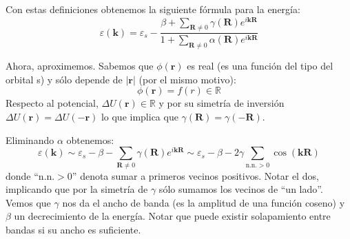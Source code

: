 Con estas definiciones obtenemos la siguiente fórmula para la energía:
\begin{equation}
  \boxed{
   \varepsilon(\mathbf{k}) = \varepsilon_s - \frac{\displaystyle \beta +
    \sum_{\mathbf{R}\neq 0}\gamma(\mathbf{R}) e^{i
      \mathbf{k}\mathbf{R}}}{\displaystyle 1 + \sum_{\mathbf{R}\neq 0}
    \alpha(\mathbf{R})e^{i \mathbf{k}\mathbf{R}}}
  } \tag{s band energy}
\end{equation}

Ahora, aproximemos. Sabemos que $\phi(\mathbf{r})$ es real (es una
función del tipo del orbital s) y sólo depende de $|\mathbf{r}|$ (por
el mismo motivo):
\begin{equation}
  \phi (\mathbf{r}) = f(r) \in \mathbb{R}
\end{equation}
Respecto al potencial, $\Delta U(\mathbf{r}) \in \mathbb{R}$ y por su
simetría de inversión $ \Delta U (\mathbf{r}) =
  \Delta U(- \mathbf{r})$ lo que implica que $\gamma(\mathbf{R}) =
  \gamma(-\mathbf{R})$.

Eliminando $\alpha$ obtenemos:
\begin{equation}
  \varepsilon(\mathbf{k}) \sim \varepsilon_s - \beta -
  \sum_{\mathbf{R}\neq 0} \gamma(\mathbf{R}) e^{i \mathbf{k}
    \mathbf{R}} \sim \varepsilon_s - \beta - 2\gamma \sum_{\text{n.n.}>0} \cos
  (\mathbf{k} \mathbf{R})
\end{equation}
donde ``$ \text{n.n.}> 0$'' denota sumar a primeros vecinos positivos. Notar el dos,
implicando que por la simetría de $\gamma$ sólo sumamos los vecinos de
``un lado''. Vemos que $\gamma$ nos da el ancho de banda (es la
amplitud de una función coseno) y $\beta$ un
decrecimiento de la energía. Notar que puede existir solapamiento
entre bandas si su ancho es suficiente.

